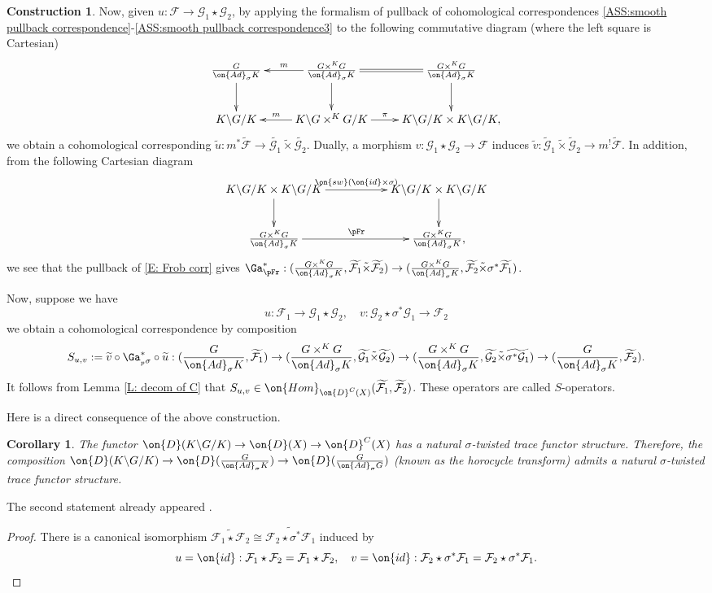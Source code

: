 \documentclass[11pt]{amsart}
\newtheorem{cor}[thm]{Corollary}
\theoremstyle{definition}
\theoremstyle{definition}
\newtheorem{construction}[thm]{Construction}
\theoremstyle{definition}
\numberwithin{equation}{subsection}
\newcommand{\mF}{{\mathcal F}}
\newcommand{\mG}{{\mathcal G}}
\newcommand{\Ad}{{\on{Ad}}}
\newcommand{\Hom}{{\on{Hom}}}
\newcommand{\id}{{\on{id}}}
\begin{document}
\begin{construction}
Now, given $u: \mF\to \mG_1\star \mG_2$, by applying the formalism of pullback of cohomological correspondences \eqref{ASS:smooth pullback correspondence}-\eqref{ASS:smooth pullback correspondence3} to the following commutative diagram (where the left square is Cartesian)
\[\xymatrix{
\frac{G}{\Ad_\sigma K}\ar[d]&\ar_-m[l]\frac{G\times^KG}{\Ad_\sigma K}\ar@{=}[r]\ar[d]&\frac{G\times^KG}{\Ad_\sigma K}\ar[d]\\
K\backslash G/K&\ar_-m[l] K\backslash G\times^KG/K\ar^-\pi[r]& K\backslash G/K\times K\backslash G/K,
}\]
we obtain a cohomological corresponding $\widetilde u: m^*\widetilde{\mF}\to \widetilde{\mG_1}\tilde\times\widetilde{\mG_2}$. Dually, a morphism $v: \mG_1\star\mG_2\to \mF$ induces $\widetilde v: \widetilde\mG_1\tilde\times\widetilde\mG_2\to m^!\widetilde\mF$. 
In addition, from the following Cartesian diagram
\[
\xymatrix{
K\backslash G/K\times K\backslash G/K\ar^-{\on{sw}(\id\times\sigma)}[rr]\ar[d]&& K\backslash G/K\times K\backslash G/K\ar[d]\\
\frac{G\times^KG}{\Ad_\sigma K}\ar^{\pFr}[rr]&& \frac{G\times^KG}{\Ad_\sigma K},
}\]
we see that the pullback of \eqref{E: Frob corr} gives $\Ga_{\pFr}^*: (\frac{G\times^KG}{\Ad_\sigma K}, \widetilde{\mF_1}\tilde\times\widetilde{\mF_2})\to (\frac{G\times^KG}{\Ad_\sigma K}, \widetilde{\mF_2}\tilde\times \sigma^*\widetilde{\mF_1})$.

Now, suppose we have
\[u: \mF_1\to \mG_1\star \mG_2,\quad v: \mG_2\star \sigma^*\mG_1\to \mF_2\]
we obtain a cohomological correspondence by composition
\[S_{u,v}:=\widetilde v \circ  \Ga_{{_p}\sigma}^* \circ \widetilde u: ( \frac{G}{\Ad_\sigma K},\widetilde{\mF_1})\to (\frac{G\times^KG}{\Ad_\sigma K},\widetilde{\mG_1}\tilde\times\widetilde{\mG_2})\to (\frac{G\times^KG}{\Ad_\sigma K}, \widetilde{\mG_2}\tilde\times\widetilde{\sigma^*\mG_1})\to (\frac{G}{\Ad_\sigma K},\widetilde{\mF_2}).\]
It follows from Lemma \ref{L: decom of C} that $S_{u,v}\in \Hom_{\on{D}^{C}(X)}(\widetilde{\mF_1},\widetilde{\mF_2})$. These operators are called $S$-operators.
\end{construction}

Here is a direct consequence of the above construction. 

\begin{cor}
\label{C:trace str on tilde}
The functor $\on{D}(K\backslash G/K)\to \on{D}(X)\to \on{D}^{C}(X)$ has a natural $\sigma$-twisted trace functor structure. Therefore, the composition $\on{D}(K\backslash G/K)\to \on{D}(\frac{G}{\Ad_\sigma K})\to \on{D}(\frac{G}{\Ad_\sigma G})$ (known as the horocycle transform) admits a natural $\sigma$-twisted trace functor structure.
\end{cor}
The second statement already appeared \cite{BFO,BN,Lu3}. 
\begin{proof}
There is a canonical isomorphism $\widetilde{\mF_1\star\mF_2}\cong\widetilde{\mF_2\star \sigma^*\mF_1}$ induced by
\[u=\id: \mF_1\star\mF_2=\mF_1\star\mF_2,\quad v=\id: \mF_2\star \sigma^*\mF_1=\mF_2\star \sigma^*\mF_1.\]
\end{proof}
\end{document}
